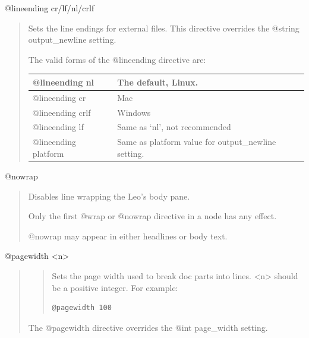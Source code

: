 \documentclass[a4paper,10pt,english]{sphinxmanual}
\begin{document}
@lineending cr/lf/nl/crlf
\begin{quote}

Sets the line endings for external files.
This directive overrides the @string output\_newline setting.

The valid forms of the @lineending directive are:

\begin{tabulary}{\linewidth}{|L|L|}
\hline

@lineending nl
 & 
The default, Linux.
\\\hline

@lineending cr
 & 
Mac
\\\hline

@lineending crlf
 & 
Windows
\\\hline

@lineending lf
 & 
Same as `nl', not recommended
\\\hline

@lineending platform
 & 
Same as platform value for output\_newline setting.
\\\hline
\end{tabulary}

\end{quote}

@nowrap
\begin{quote}

Disables line wrapping the Leo's body pane.

Only the first @wrap or @nowrap directive in a node has any effect.

@nowrap may appear in either headlines or body text.
\end{quote}

@pagewidth \textless{}n\textgreater{}
\begin{quote}
\begin{quote}

Sets the page width used to break doc parts into lines.
\textless{}n\textgreater{} should be a positive integer.  For example:

\begin{Verbatim}[commandchars=\\\{\}]
@pagewidth 100
\end{Verbatim}
\end{quote}

The @pagewidth directive overrides the @int page\_width setting.
\end{quote}
\end{document}
